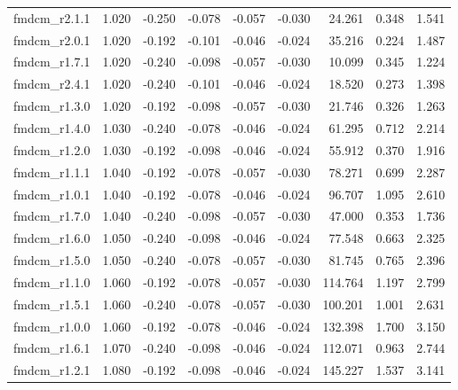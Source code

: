 \begin{longtable}{lrrrrrrrr}
fmdcm\_r2.1.1 &     1.020 &   -0.250 &   -0.078 &  -0.057 &  -0.030 &      24.261 &    0.348 &       1.541 \\
fmdcm\_r2.0.1 &     1.020 &   -0.192 &   -0.101 &  -0.046 &  -0.024 &      35.216 &    0.224 &       1.487 \\
fmdcm\_r1.7.1 &     1.020 &   -0.240 &   -0.098 &  -0.057 &  -0.030 &      10.099 &    0.345 &       1.224 \\
fmdcm\_r2.4.1 &     1.020 &   -0.240 &   -0.101 &  -0.046 &  -0.024 &      18.520 &    0.273 &       1.398 \\
fmdcm\_r1.3.0 &     1.020 &   -0.192 &   -0.098 &  -0.057 &  -0.030 &      21.746 &    0.326 &       1.263 \\
fmdcm\_r1.4.0 &     1.030 &   -0.240 &   -0.078 &  -0.046 &  -0.024 &      61.295 &    0.712 &       2.214 \\
fmdcm\_r1.2.0 &     1.030 &   -0.192 &   -0.098 &  -0.046 &  -0.024 &      55.912 &    0.370 &       1.916 \\
fmdcm\_r1.1.1 &     1.040 &   -0.192 &   -0.078 &  -0.057 &  -0.030 &      78.271 &    0.699 &       2.287 \\
fmdcm\_r1.0.1 &     1.040 &   -0.192 &   -0.078 &  -0.046 &  -0.024 &      96.707 &    1.095 &       2.610 \\
fmdcm\_r1.7.0 &     1.040 &   -0.240 &   -0.098 &  -0.057 &  -0.030 &      47.000 &    0.353 &       1.736 \\
fmdcm\_r1.6.0 &     1.050 &   -0.240 &   -0.098 &  -0.046 &  -0.024 &      77.548 &    0.663 &       2.325 \\
fmdcm\_r1.5.0 &     1.050 &   -0.240 &   -0.078 &  -0.057 &  -0.030 &      81.745 &    0.765 &       2.396 \\
fmdcm\_r1.1.0 &     1.060 &   -0.192 &   -0.078 &  -0.057 &  -0.030 &     114.764 &    1.197 &       2.799 \\
fmdcm\_r1.5.1 &     1.060 &   -0.240 &   -0.078 &  -0.057 &  -0.030 &     100.201 &    1.001 &       2.631 \\
fmdcm\_r1.0.0 &     1.060 &   -0.192 &   -0.078 &  -0.046 &  -0.024 &     132.398 &    1.700 &       3.150 \\
fmdcm\_r1.6.1 &     1.070 &   -0.240 &   -0.098 &  -0.046 &  -0.024 &     112.071 &    0.963 &       2.744 \\
fmdcm\_r1.2.1 &     1.080 &   -0.192 &   -0.098 &  -0.046 &  -0.024 &     145.227 &    1.537 &       3.141 \\
\end{longtable}
